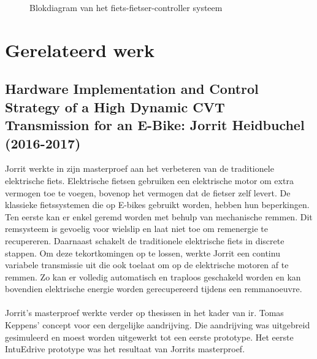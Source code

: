\begin{figure}[h]
\caption{Blokdiagram van het fiets-fietser-controller systeem}
  \label{fig:Blokdiagram van het fiets-fietser-controller systeem}
\end{figure}
\newpage
\section{Gerelateerd werk}
\subsection{Hardware Implementation and Control Strategy of a High Dynamic CVT Transmission for an E-Bike: Jorrit Heidbuchel (2016-2017)}
Jorrit werkte in zijn masterproef aan het verbeteren van de traditionele elektrische fiets. Elektrische fietsen gebruiken een elektrische motor om extra vermogen toe te voegen, bovenop het vermogen dat de fietser zelf levert. De klassieke fietssystemen die op E-bikes gebruikt worden, hebben hun beperkingen. Ten eerste kan er enkel geremd worden met behulp van mechanische remmen. Dit remsysteem is gevoelig voor wielslip en laat niet toe om remenergie te recupereren.  Daarnaast schakelt de traditionele elektrische fiets in discrete stappen. Om deze tekortkomingen op te lossen, werkte  Jorrit een continu variabele transmissie uit die ook toelaat om op de elektrische motoren af te remmen. Zo kan er volledig automatisch en traploos geschakeld worden en kan bovendien elektrische energie worden gerecupereerd tijdens een remmanoeuvre. 
\\\\
Jorrit’s masterproef werkte verder op thesissen in het kader van ir. Tomas Keppens’ concept voor een dergelijke aandrijving. Die aandrijving was uitgebreid gesimuleerd en moest worden uitgewerkt tot een eerste prototype. Het eerste IntuEdrive prototype was het resultaat van Jorrits masterproef.


